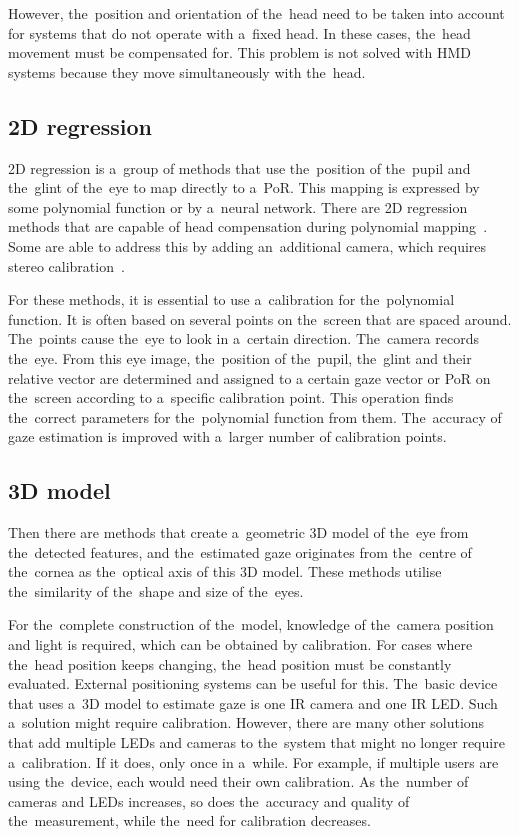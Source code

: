 However, the~position and orientation of the~head need to be taken into account for systems that do not operate with a~fixed head. In these cases, the~head movement must be compensated for. This problem is not solved with HMD systems because they move simultaneously with the~head.~\cite{anuradha2017review}

\subsection{2D regression}

2D regression is a~group of methods that use the~position of the~pupil and the~glint of the~eye to map directly to a~PoR. This mapping is expressed by some polynomial function or by a~neural network. There are 2D regression methods that are capable of head compensation during polynomial mapping~\cite{anuradha2017review}. Some are able to address this by adding an~additional camera, which requires stereo calibration~\cite{hansen2010}.

For these methods, it is essential to use a~calibration for the~polynomial function. It is often based on several points on the~screen that are spaced around. The~points cause the~eye to look in a~certain direction. The~camera records the~eye. From this eye image, the~position of the~pupil, the~glint and their relative vector are determined and assigned to a certain gaze vector or PoR on the~screen according to a~specific calibration point. This operation finds the~correct parameters for the~polynomial function from them. The~accuracy of gaze estimation is improved with a~larger number of calibration points.~\cite{anuradha2017review}

\subsection{3D model}
Then there are methods that create a~geometric 3D model of the~eye from the~detected features, and the~estimated gaze originates from the~centre of the~cornea as the~optical axis of this 3D model. These methods utilise the~similarity of the~shape and size of the~eyes.~\cite{anuradha2017review} 

For the~complete construction of the~model, knowledge of the~camera position and light is required, which can be obtained by calibration. For cases where the~head position keeps changing, the~head position must be constantly evaluated. External positioning systems can be useful for this. The~basic device that uses a~3D model to estimate gaze is one IR camera and one IR LED. Such a~solution might require calibration. However, there are many other solutions that add multiple LEDs and cameras to the~system that might no longer require a~calibration. If it does, only once in a~while. For example, if multiple users are using the~device, each would need their own calibration. As the~number of cameras and LEDs increases, so does the~accuracy and quality of the~measurement, while the~need for calibration decreases.~\cite{trnka2020thesis}
